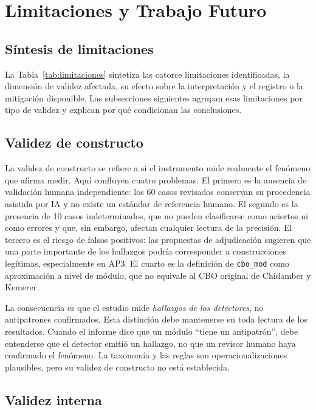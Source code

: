 \section{Limitaciones y Trabajo Futuro}\label{sec:limitaciones}

\subsection{Síntesis de limitaciones}

La Tabla~\ref{tab:limitaciones} sintetiza las catorce limitaciones identificadas, la dimensión de validez afectada, su efecto sobre la interpretación y el registro o la mitigación disponible. Las subsecciones siguientes agrupan esas limitaciones por tipo de validez y explican por qué condicionan las conclusiones.



\subsection{Validez de constructo}

La validez de constructo se refiere a si el instrumento mide realmente el fenómeno que afirma medir. Aquí confluyen cuatro problemas. El primero es la ausencia de validación humana independiente: los 60 casos revisados conservan su procedencia asistida por IA y no existe un estándar de referencia humano. El segundo es la presencia de 10 casos indeterminados, que no pueden clasificarse como aciertos ni como errores y que, sin embargo, afectan cualquier lectura de la precisión. El tercero es el riesgo de falsos positivos: las propuestas de adjudicación sugieren que una parte importante de los hallazgos podría corresponder a construcciones legítimas, especialmente en AP3. El cuarto es la definición de \texttt{cbo\_mod} como aproximación a nivel de módulo, que no equivale al CBO original de Chidamber y Kemerer.

La consecuencia es que el estudio mide \emph{hallazgos de los detectores}, no antipatrones confirmados. Esta distinción debe mantenerse en toda lectura de los resultados. Cuando el informe dice que un módulo “tiene un antipatrón”, debe entenderse que el detector emitió un hallazgo, no que un revisor humano haya confirmado el fenómeno. La taxonomía y las reglas son operacionalizaciones plausibles, pero su validez de constructo no está establecida.

\subsection{Validez interna}


